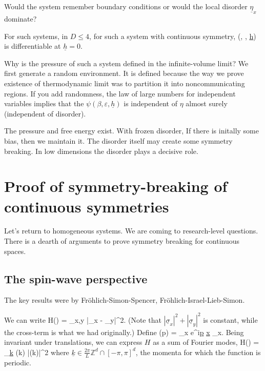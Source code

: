 Would the system remember boundary conditions or would the local disorder $\underline{\eta}_x$ dominate?

\begin{theorem}
For such systems, in $D\le 4$, for such a system with continuous symmetry, 
\be
\psi(\beta, \varepsilon, \underline{h}) 
\ee
is differentiable at $\underline{h}=0$.
\end{theorem}
Why is the pressure of such a system defined in the infinite-volume limit? We first generate a random environment. 
It is defined because the way we prove existence of thermodynamic limit was to partition it into noncommunicating regions. If you add randomness, %
the law of large numbers for independent variables implies that the $\psi(\beta, \varepsilon, \underline{h})$ is independent of $\eta$ almost surely (independent of disorder). 

The pressure and free energy exist. With frozen disorder, 
If there is initally some bias, then we maintain it. The disorder itself may create some symmetry breaking. In low dimensions the disorder plays a decisive role.

\section{Proof of symmetry-breaking of continuous symmetries
}

Let's return to homogeneous systems. We are coming to research-level questions. There is a dearth of arguments to prove symmetry breaking for continuous spaces. 

\subsection{The spin-wave perspective}

The key results were by Fr\"ohlich-Simon-Spencer, Fr\"ohlich-Israel-Lieb-Simon.

We can write 
\be
H(\sigma) =  \sum_{x,y} |\underline{\sigma}_x - \underline{\sigma}_y|^2.
\ee
(Note that $|\underline{\sigma}_x|^2 + |\underline{\sigma}_y|^2$ is constant, while the cross-term is what we had originally.)
Define
\be
\widehat{\sigma} (p) =  \sum_{x\in \Lambda} e^{i\underline{p} \cdot \underline{x}} \underline{\sigma}_x.
\ee
Being invariant under translations, we can express $H$ as a sum of Fourier modes,
\be
H(\sigma) = \sum_{\underline{k}} (k) |\widehat{\sigma}(k)|^2
\ee
where $\underline{k} \in \frac{2\pi}{L}\mathbb{Z}^d \cap [-\pi, \pi]^d$,
the momenta for which the function is periodic.

